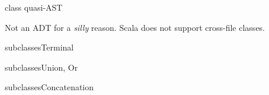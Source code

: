 

\begin{frame}{ class quasi-AST}
  \scalebox{0.6}{}

  \medskip

  Not an ADT for a \emph{silly} reason.  Scala does not support cross-file  classes.

\end{frame}

\newsavebox\leafbox
\begin{lrbox}{\leafbox}
  \begin{minipage}{12cm}
    
  \end{minipage}
\end{lrbox}

\begin{frame}{ subclasses}{Terminal}
  \usebox\leafbox
\end{frame}

\newsavebox\orbox
\begin{lrbox}{\orbox}
  \begin{minipage}{12cm}
    
  \end{minipage}
\end{lrbox}

\newsavebox\andbox
\begin{lrbox}{\andbox}
  \begin{minipage}{12cm}
    
  \end{minipage}
\end{lrbox}


\begin{frame}{ subclasses}{Union, Or}
  \usebox\orbox
 \end{frame}




\newsavebox\catbox
\begin{lrbox}{\catbox}
  \begin{minipage}{12cm}
    
  \end{minipage}
\end{lrbox}


\begin{frame}{ subclasses}{Concatenation}
  \usebox\catbox
 \end{frame}



\newsavebox\starbox
\begin{lrbox}{\starbox}
  \begin{minipage}{12cm}
    
  \end{minipage}
\end{lrbox}

